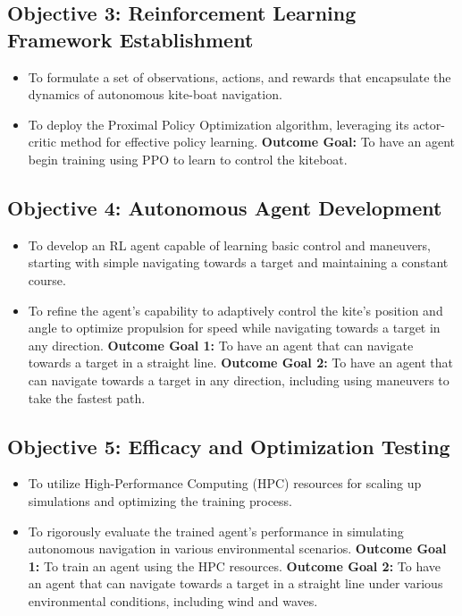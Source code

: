 \subsection*{Objective 3: Reinforcement Learning Framework Establishment}
\begin{itemize}
    \item To formulate a set of observations, actions, and rewards that encapsulate the dynamics of autonomous kite-boat navigation.
    \item To deploy the Proximal Policy Optimization algorithm, leveraging its actor-critic method for effective policy learning.
    \newline\textbf{Outcome Goal:} To have an agent begin training using PPO to learn to control the kiteboat.
\end{itemize}

\subsection*{Objective 4: Autonomous Agent Development}
\begin{itemize}
    \item To develop an RL agent capable of learning basic control and maneuvers, starting with simple navigating towards a target and maintaining a constant course.
    \item To refine the agent's capability to adaptively control the kite's position and angle to optimize propulsion for speed while navigating towards a target in any direction.
    \newline\textbf{Outcome Goal 1:} To have an agent that can navigate towards a target in a straight line.
    \newline\textbf{Outcome Goal 2:} To have an agent that can navigate towards a target in any direction, including using maneuvers to take the fastest path.
\end{itemize}

\subsection*{Objective 5: Efficacy and Optimization Testing}
\begin{itemize}
    \item To utilize High-Performance Computing (HPC) resources for scaling up simulations and optimizing the training process.
    \item To rigorously evaluate the trained agent’s performance in simulating autonomous navigation in various environmental scenarios.
    \newline\textbf{Outcome Goal 1:} To train an agent using the HPC resources.
    \newline\textbf{Outcome Goal 2:} To have an agent that can navigate towards a target in a straight line under various environmental conditions, including wind and waves.
\end{itemize}

